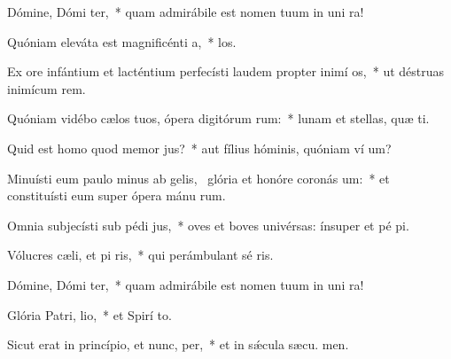 \item Dómine, Dómi ter,~* quam admirábile est nomen tuum in uni ra!
\item Quóniam eleváta est magnificénti a,~*  los.
\item Ex ore infántium et lacténtium perfecísti laudem propter inimí os,~* ut déstruas inimícum  rem.
\item Quóniam vidébo cælos tuos, ópera digitórum rum:~* lunam et stellas, quæ  ti.
\item Quid est homo quod memor  jus?~* aut fílius hóminis, quóniam ví um?
\item Minuísti eum paulo minus ab gelis,~\pscross{} glória et honóre coronás um:~* et constituísti eum super ópera mánu rum.
\item Omnia subjecísti sub pédi jus,~* oves et boves univérsas: ínsuper et pé pi.
\item Vólucres cæli, et pi ris,~* qui perámbulant sé ris.
\item Dómine, Dómi ter,~* quam admirábile est nomen tuum in uni ra!
\item Glória Patri,  lio,~* et Spirí to.
\item Sicut erat in princípio, et nunc,  per,~* et in sǽcula sæcu. men.
